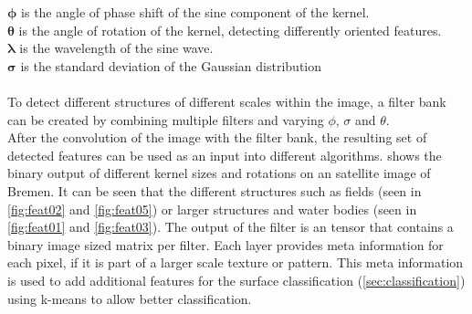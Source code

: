 \documentclass[12pt,a4paper, english,twoside]{scrartcl}
\begin{document}
        $\boldsymbol{\phi}$ is the angle of phase shift of the sine component of the kernel. \\
        $\boldsymbol{\theta}$ is the angle of rotation of the kernel, detecting differently oriented features.\\
        $\boldsymbol{\lambda}$ is the wavelength of the sine wave. \\
        $\boldsymbol{\sigma}$ is the standard deviation of the Gaussian distribution\\ \\
      \noindent
      To detect different structures of different scales within the image, a filter bank can be created by combining multiple filters and varying $\phi$, $\sigma$ and $\theta$.\\
      After the convolution of the image with the filter bank, the resulting set of detected features can be used as an input into different algorithms.
       shows the binary output of different kernel sizes and rotations on an satellite image of Bremen. 
      It can be seen that the different structures such as fields (seen in \cref{fig:feat02} and \cref{fig:feat05}) or larger structures and water bodies (seen in \cref{fig:feat01} and \cref{fig:feat03}).
      The output of the filter is an tensor that contains a binary image sized matrix per filter. Each layer provides meta information for each pixel, if it is part of a larger scale texture or pattern. 
      This meta information is used to add additional features for the surface classification (\cref{sec:classification}) using k-means %
      to allow better classification.%
\end{document}
